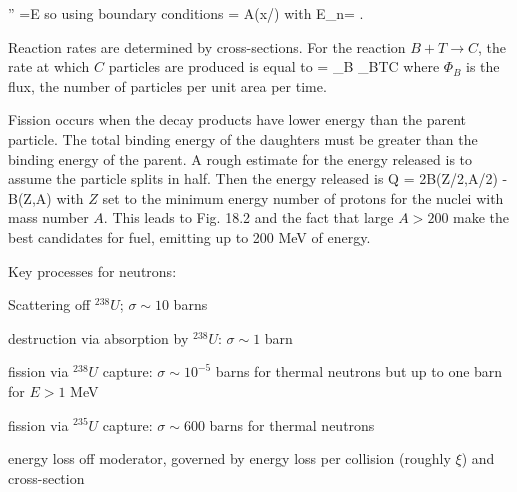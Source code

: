 \documentclass[11pt]{book}
\begin{document}
\be
{} \psi'' =E\psi
\ee
so using boundary conditions
\be
\psi = A\sin(x/\hbar)
\ee
with 
\be
E_n=
.\ee
{}








Reaction rates are determined by cross-sections. For the reaction $B+T\rightarrow C$, the rate at which $C$ particles are produced is equal to
\be
{} = \Phi_B \sigma_{BT\rightarrow C} \ee
where $\Phi_B$ is the flux, the number of particles per unit area per time. 

Fission occurs when the decay products have lower energy than the parent particle. The total binding energy of the daughters must be greater than the binding energy of the parent. A rough estimate for the energy released is to assume the particle splits in half. Then the energy released is
\be
Q = 2B(Z/2,A/2) - B(Z,A)
\ee
with $Z$ set to the minimum energy number of protons for the nuclei with mass number $A$. This leads to Fig. 18.2 and the fact that large $A>200$ make the best candidates for fuel, emitting up to 200 MeV of energy.

Key processes for neutrons:
\bei
\item Scattering off $^{238}U$; $\sigma\sim 10$ barns
\item destruction via absorption by $^{238}U$: $\sigma\sim 1$ barn
\item fission via $^{238}U$ capture: $\sigma\sim 10^{-5}$ barns for thermal neutrons but up to one barn for $E>1$ MeV
\item fission via $^{235}U$ capture: $\sigma\sim600$ barns for thermal neutrons
\item energy loss off moderator, governed by energy loss per collision (roughly $\xi$) and cross-section
\eei
\end{document}
